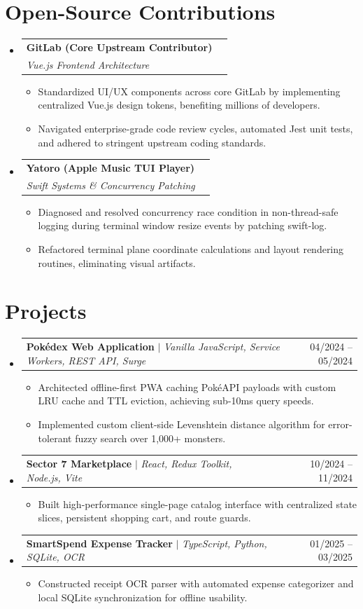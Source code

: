 \documentclass[letterpaper,10pt]{article}
\makeatletter
\newcommand{\resumeItem}[1]{\item\small{{#1 \vspace{-2pt}}}}
\newcommand{\resumeSubheading}[4]{
  \vspace{-2pt}\item
    \begin{tabular*}{0.97\textwidth}[t]{l@{\extracolsep{\fill}}r}
      \textbf{#1} & #2 \\
      \textit{\small#3} & \textit{\small #4} \\
    \end{tabular*}\vspace{-7pt}
}
\newcommand{\resumeProjectHeading}[2]{
    \item
    \begin{tabular*}{0.97\textwidth}{l@{\extracolsep{\fill}}r}
      \small#1 & #2 \\
    \end{tabular*}\vspace{-7pt}
}
\newcommand{\resumeSubHeadingListStart}{\begin{itemize}[leftmargin=0.15in, label={}]}
\newcommand{\resumeSubHeadingListEnd}{\end{itemize}}
\newcommand{\resumeItemListStart}{\begin{itemize}}
\newcommand{\resumeItemListEnd}{\end{itemize}\vspace{-5pt}}
\makeatother
\begin{document}
\section{Open-Source Contributions}
\resumeSubHeadingListStart
  \resumeSubheading{GitLab (Core Upstream Contributor)}{}{Vue.js Frontend Architecture}{}
  \resumeItemListStart
    \resumeItem{Standardized UI/UX components across core GitLab by implementing centralized Vue.js design tokens, benefiting millions of developers.}
    \resumeItem{Navigated enterprise-grade code review cycles, automated Jest unit tests, and adhered to stringent upstream coding standards.}
  \resumeItemListEnd
  \resumeSubheading{Yatoro (Apple Music TUI Player)}{}{Swift Systems \& Concurrency Patching}{}
  \resumeItemListStart
    \resumeItem{Diagnosed and resolved concurrency race condition in non-thread-safe logging during terminal window resize events by patching swift-log.}
    \resumeItem{Refactored terminal plane coordinate calculations and layout rendering routines, eliminating visual artifacts.}
  \resumeItemListEnd
\resumeSubHeadingListEnd

\section{Projects}
\resumeSubHeadingListStart
  \resumeProjectHeading{\textbf{Pokédex Web Application} $|$ \emph{Vanilla JavaScript, Service Workers, REST API, Surge}}{04/2024 -- 05/2024}
  \resumeItemListStart
    \resumeItem{Architected offline-first PWA caching PokéAPI payloads with custom LRU cache and TTL eviction, achieving sub-10ms query speeds.}
    \resumeItem{Implemented custom client-side Levenshtein distance algorithm for error-tolerant fuzzy search over 1,000+ monsters.}
  \resumeItemListEnd
  \resumeProjectHeading{\textbf{Sector 7 Marketplace} $|$ \emph{React, Redux Toolkit, Node.js, Vite}}{10/2024 -- 11/2024}
  \resumeItemListStart
    \resumeItem{Built high-performance single-page catalog interface with centralized state slices, persistent shopping cart, and route guards.}
  \resumeItemListEnd
  \resumeProjectHeading{\textbf{SmartSpend Expense Tracker} $|$ \emph{TypeScript, Python, SQLite, OCR}}{01/2025 -- 03/2025}
  \resumeItemListStart
    \resumeItem{Constructed receipt OCR parser with automated expense categorizer and local SQLite synchronization for offline usability.}
  \resumeItemListEnd
\resumeSubHeadingListEnd

\end{document}

